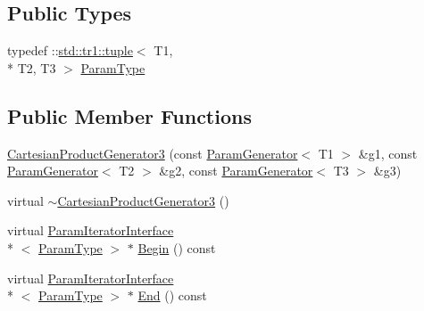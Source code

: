 \subsection*{Public Types}
\begin{DoxyCompactItemize}
\item 
typedef \-::\hyperlink{classstd_1_1tr1_1_1tuple}{std\-::tr1\-::tuple}$<$ T1, \\*
T2, T3 $>$ \hyperlink{classtesting_1_1internal_1_1CartesianProductGenerator3_a8819b73a6af2ecca7d25e09f759f2757}{Param\-Type}
\end{DoxyCompactItemize}
\subsection*{Public Member Functions}
\begin{DoxyCompactItemize}
\item 
\hyperlink{classtesting_1_1internal_1_1CartesianProductGenerator3_afdca1e94b01f654564b9cbe66fb5ca94}{Cartesian\-Product\-Generator3} (const \hyperlink{classtesting_1_1internal_1_1ParamGenerator}{Param\-Generator}$<$ T1 $>$ \&g1, const \hyperlink{classtesting_1_1internal_1_1ParamGenerator}{Param\-Generator}$<$ T2 $>$ \&g2, const \hyperlink{classtesting_1_1internal_1_1ParamGenerator}{Param\-Generator}$<$ T3 $>$ \&g3)
\item 
virtual \hyperlink{classtesting_1_1internal_1_1CartesianProductGenerator3_ab99913e4d1052b940e593cbdceb5d47a}{$\sim$\-Cartesian\-Product\-Generator3} ()
\item 
virtual \hyperlink{classtesting_1_1internal_1_1ParamIteratorInterface}{Param\-Iterator\-Interface}\\*
$<$ \hyperlink{classtesting_1_1internal_1_1CartesianProductGenerator3_a8819b73a6af2ecca7d25e09f759f2757}{Param\-Type} $>$ $\ast$ \hyperlink{classtesting_1_1internal_1_1CartesianProductGenerator3_a0964b5fe9c9122e850ab5cdc79b1667a}{Begin} () const 
\item 
virtual \hyperlink{classtesting_1_1internal_1_1ParamIteratorInterface}{Param\-Iterator\-Interface}\\*
$<$ \hyperlink{classtesting_1_1internal_1_1CartesianProductGenerator3_a8819b73a6af2ecca7d25e09f759f2757}{Param\-Type} $>$ $\ast$ \hyperlink{classtesting_1_1internal_1_1CartesianProductGenerator3_a3ec67f2625c4bf090308e8f5fc511838}{End} () const 
\end{DoxyCompactItemize}


